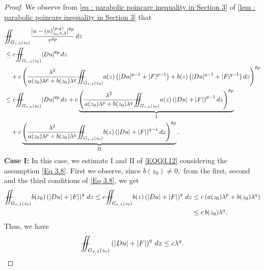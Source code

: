 \documentclass[11pt,oneside, english,reqno,twoside a4paper]{amsart}
\theoremstyle{definition}
\numberwithin{theorem}{section}
\numberwithin{equation}{section}
\newcommand{\iintss}{{\int\hspace{-0.28cm}\int}}
\newcommand{ \miints }{{\iintss\hspace{-0.56cm} -\hspace{-0.15cm}-}}
\newcommand{\miint}[1]{{\miints_{\hspace{-0.13cm}#1}}}
\begin{document}
\begin{proof}
We observe from \eqref{eq : parabolic poincare inequality in Section 3} of \cref{lem : parabolic poincare inequality in Section 3} that
\begin{align}\label{EQQ3.12}
    &\miint{G_{\tau, \lambda}(z_0)}\frac{|u-(u)^{(p,q)}_{z_0, \tau, \lambda}|^{\theta p}}{\tau^{\theta p}}\,dz\nonumber\\
    &\leq c\miint{G_{\tau, \lambda}(z_0)}|Du|^{\theta p}\, dz \nonumber\\
    &\quad + c\left(\frac{\lambda^2}{a(z_0)\lambda^p+b(z_0)\lambda^q}\miint{G_{\tau, \lambda}(z_0)}a(z)\left(|Du|^{p-1}+|F|^{p-1}\right)+b(z)\left(|Du|^{q-1}+|F|^{q-1}\right) dz\right)^{\theta p}\nonumber\\
    &\leq c\miint{G_{\tau, \lambda}(z_0)}|Du|^{\theta p}\, dz+ c\underbrace{\left(\frac{\lambda^2}{a(z_0)\lambda^p+b(z_0)\lambda^q}\miint{G_{\tau, \lambda}(z_0)}a(z)\left(|Du|+|F|\right)^{p-1} dz\right)^{\theta p}}_{\mathrm{I}}\nonumber\\
    &\quad +c\underbrace{\left(\frac{\lambda^2}{a(z_0)\lambda^p+b(z_0)\lambda^q}\miint{G_{\tau, \lambda}(z_0)}b(z)\left(|Du|+|F|\right)^{q-1} dz\right)^{\theta p}}_{\mathrm{II}}.
\end{align}
\textbf{Case I:} In this case, we estimate $\mathrm{I}$ and $\mathrm{II}$ of \eqref{EQQ3.12} considering the assumption \eqref{Eq 3.8}. First we observe, since $b(z_0)\neq 0,$ from the first, second and the third conditions of \eqref{Eq 3.8}, we get
\begin{align*}
 \miint{G_{\tau, \lambda}(z_0)} b(z_0)\left(|Du|+|F|\right)^q\,dz \leq c \miint{G_{\tau, \lambda}(z_0)} b(z)\left(|Du|+|F|\right)^q\,dz&\leq c \left(a(z_0)\lambda^p+b(z_0)\lambda^q\right)\\
 &\leq c\, b(z_0)\lambda^q.
\end{align*}
Thus, we have
\begin{align}\label{bound by q}
    \miint{G_{\tau, \lambda}(z_0)}\left(|Du|+|F|\right)^q\, dz \leq c\lambda^q.
\end{align}


\end{proof}
\end{document}
